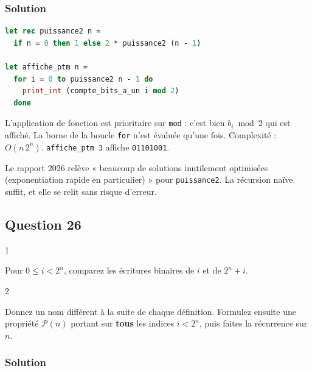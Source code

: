 \documentclass[11pt,a4paper]{article}
\begin{document}
\hypertarget{solution-24}{%
\subsubsection{Solution}\label{solution-24}}

\begin{lstlisting}[language=Caml]
let rec puissance2 n =
  if n = 0 then 1 else 2 * puissance2 (n - 1)

let affiche_ptm n =
  for i = 0 to puissance2 n - 1 do
    print_int (compte_bits_a_un i mod 2)
  done
\end{lstlisting}

L'application de fonction est prioritaire sur \texttt{mod} : c'est bien \(b_i \bmod 2\) qui est affiché. La borne de la boucle \texttt{for} n'est évaluée qu'une fois. Complexité : \(O(n\,2^n)\). \texttt{affiche\_ptm\ 3} affiche \texttt{01101001}.

\begin{jury}

Le rapport 2026 relève « beaucoup de solutions inutilement optimisées (exponentiation rapide en particulier) » pour \texttt{puissance2}. La récursion naïve suffit, et elle se relit sans risque d'erreur.

\end{jury}

\hypertarget{question-26}{%
\subsection{Question 26}\label{question-26}}

\begin{indication}{1}

Pour \(0\le i<2^n\), comparez les écritures binaires de \(i\) et de \(2^n+i\).

\end{indication}

\begin{indication}{2}

Donnez un nom différent à la suite de chaque définition. Formulez ensuite une propriété \(\mathcal P(n)\) portant sur \textbf{tous} les indices \(i<2^n\), puis faites la récurrence sur \(n\).

\end{indication}

\hypertarget{solution-25}{%
\subsubsection{Solution}\label{solution-25}}
\end{document}
